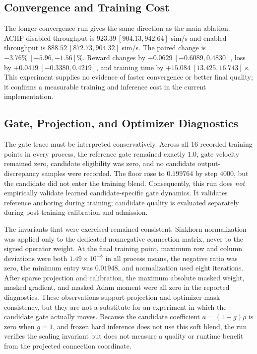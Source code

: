 \documentclass{article}
\begin{document}
\subsection{Convergence and Training Cost}

The longer convergence run gives the same direction as the main ablation.
ACHF-disabled throughput is $923.39\ [904.13,942.64]$ sim/s and enabled
throughput is $888.52\ [872.73,904.32]$ sim/s. The paired change is
$-3.76\%\ [-5.96,-1.56]\%$. Reward changes by
$-0.0629\ [-0.6089,0.4830]$, loss by
$+0.0419\ [-0.3380,0.4219]$, and training time by
$+15.084\ [13.425,16.743]$ s. This experiment supplies no evidence of faster
convergence or better final quality; it confirms a measurable training and
inference cost in the current implementation.

\subsection{Gate, Projection, and Optimizer Diagnostics}

The gate trace must be interpreted conservatively. Across all 16 recorded
training points in every process, the reference gate remained exactly $1.0$,
gate velocity remained zero, candidate eligibility was zero, and no candidate
output-discrepancy samples were recorded. The floor rose to $0.199764$ by step
4000, but the candidate did not enter the training blend. Consequently, this
run does \emph{not} empirically validate learned candidate-specific gate
dynamics. It validates reference anchoring during training; candidate quality
is evaluated separately during post-training calibration and admission.

The invariants that were exercised remained consistent. Sinkhorn normalization
was applied only to the dedicated nonnegative connection matrix, never to the
signed operator weight. At the final training point, maximum row and column
deviations were both $1.49\times10^{-8}$ in all process means, the negative
ratio was zero, the minimum entry was $0.01948$, and normalization used eight
iterations. After sparse projection and calibration, the maximum absolute
masked weight, masked gradient, and masked Adam moment were all zero in the
reported diagnostics. These observations support projection and optimizer-mask
consistency, but they are not a substitute for an experiment in which the
candidate gate actually moves. Because the candidate coefficient
$a=(1-g)\rho$ is zero when $g=1$, and frozen hard inference does not use this
soft blend, the run verifies the scaling invariant but does not measure a
quality or runtime benefit from the projected connection coordinate.
\end{document}
